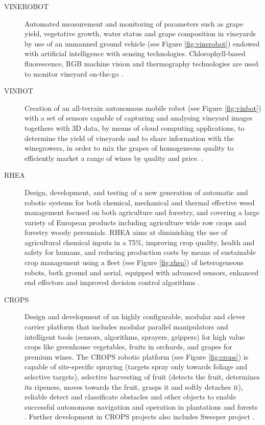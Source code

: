 \begin{description}
	\item[VINEROBOT] Automated measurement and monitoring of parameters such as grape yield, vegetative growth, water status and grape composition in vineyards by use of an unmanned ground vehicle (see Figure \ref{fig:vinerobot}) endowed with artificial intelligence with sensing technologies. Chlorophyll-based fluorescence, RGB machine vision and thermography technologies are used to monitor vineyard on-the-go \parencite{vinerobot}.
	\item[VINBOT] Creation of an all-terrain autonomous mobile robot (see Figure \ref{fig:vinbot}) with a set of sensors capable of capturing and analysing vineyard images togethere with 3D data, by means of cloud computing applications, to determine the yield of vineyards and to share information with the winegrowers, in order to mix the grapes of homogeneous quality to efficiently market a range of wines by quality and price. \parencite{vinbot}.
	\item[RHEA] Design, development, and testing of a new generation of automatic and robotic systems for both chemical, mechanical and thermal effective weed management focused on both agriculture and forestry, and covering a large variety of European products including agriculture wide row crops and forestry woody perennials. RHEA aims at diminishing the use of agricultural chemical inputs in a 75\%, improving crop quality, health and safety for humans, and reducing production costs by means of sustainable crop management using a fleet (see Figure \ref{fig:rhea}) of heterogeneous robots, both ground and aerial, equipped with advanced sensors, enhanced end effectors and improved decision control algorithms \parencite{rhea}.
	\item[CROPS] Design and development of an highly configurable, modular and clever carrier platform that includes modular parallel manipulators and intelligent tools (sensors, algorithms, sprayers, grippers) for high value crops like greenhouse vegetables, fruits in orchards, and grapes for premium wines. The CROPS robotic platform (see Figure \ref{fig:crops}) is capable of site-specific spraying (targets spray only towards foliage and selective targets), selective harvesting of fruit (detects the fruit, determines its ripeness, moves towards the fruit, grasps it and softly detaches it), reliable detect and classificate obstacles and other objects to enable successful autonomous navigation and operation in plantations and forests \parencite{crops}. Further development in CROPS projects also includes Sweeper project \parencite{sweeper}.
\end{description}


